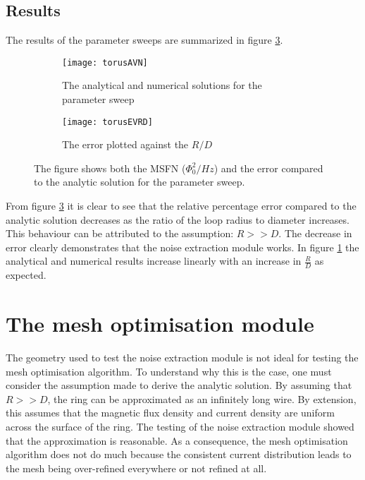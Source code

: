 \subsection{Results}

The results of the parameter sweeps are summarized in figure \ref{fig:resTorus}.
\begin{figure}[H]
    \centering
    \begin{subfigure}[b]{0.48\textwidth}
        \centering
        \texttt{[image: torusAVN]}
        \caption{The analytical and numerical solutions for the parameter sweep}
        \label{fig:MSFNvRD}
    \end{subfigure}
    \hfill
    \begin{subfigure}[b]{0.48\textwidth}
        \centering
        \texttt{[image: torusEVRD]}
        \caption{The error plotted against the $R/D$}
        \label{fig:evRD}
    \end{subfigure}
    \caption{The figure shows both the MSFN ($\Phi_0^2 / Hz$) and the error compared to the analytic solution for the parameter sweep.}
    \label{fig:resTorus}
\end{figure}
From figure \ref{fig:resTorus} it is clear to see that the relative percentage error compared to the analytic solution decreases as the ratio of the loop radius to diameter increases. This behaviour can be attributed to the assumption: $R >> D$. The decrease in error clearly demonstrates that the noise extraction module works. In figure \ref{fig:MSFNvRD} the analytical and numerical results increase linearly with an increase in $\frac{R}{D}$ as expected.

\section{The mesh optimisation module}
The geometry used to test the noise extraction module is not ideal for testing the mesh optimisation algorithm. To understand why this is the case, one must consider the assumption made to derive the analytic solution. By assuming that $R >> D$, the ring can be approximated as an infinitely long wire. By extension, this assumes that the magnetic flux density and current density are uniform across the surface of the ring. The testing of the noise extraction module showed that the approximation is reasonable. As a consequence, the mesh optimisation algorithm does not do much because the consistent current distribution leads to the mesh being over-refined everywhere or not refined at all.
